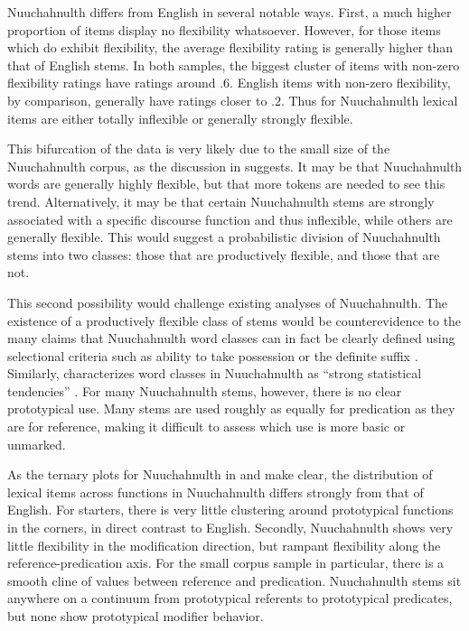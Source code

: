 Nuuchahnulth differs from English in several notable ways. First, a much higher proportion of items display no flexibility whatsoever. However, for those items which do exhibit flexibility, the average flexibility rating is generally higher than that of English stems. In both samples, the biggest cluster of items with non-zero flexibility ratings have ratings around $.6$. English items with non-zero flexibility, by comparison, generally have ratings closer to $.2$. Thus for Nuuchahnulth lexical items are either totally inflexible or generally strongly flexible.

This bifurcation of the data is very likely due to the small size of the Nuuchahnulth corpus, as the discussion in  suggests. It may be that Nuuchahnulth words are generally highly flexible, but that more tokens are needed to see this trend. Alternatively, it may be that certain Nuuchahnulth stems are strongly associated with a specific discourse function and thus inflexible, while others are generally flexible. This would suggest a probabilistic division of Nuuchahnulth stems into two classes: those that are productively flexible, and those that are not.

This second possibility would challenge existing analyses of Nuuchahnulth. The existence of a productively flexible class of stems would be counterevidence to the many claims that Nuuchahnulth word classes can in fact be clearly defined using selectional criteria such as ability to take possession or the definite suffix . Similarly, \textcite[???]{Nakayama2001} characterizes word classes in Nuuchahnulth as \enquote{strong statistical tendencies} . For many Nuuchahnulth stems, however, there is no clear prototypical use. Many stems are used roughly as equally for predication as they are for reference, making it difficult to assess which use is more basic or unmarked.

As the ternary plots for Nuuchahnulth in  and  make clear, the distribution of lexical items across functions in Nuuchahnulth differs strongly from that of English. For starters, there is very little clustering around prototypical functions in the corners, in direct contrast to English. Secondly, Nuuchahnulth shows very little flexibility in the modification direction, but rampant flexibility along the reference-predication axis. For the small corpus sample in particular, there is a smooth cline of values between reference and predication. Nuuchahnulth stems sit anywhere on a continuum from prototypical referents to prototypical predicates, but none show prototypical modifier behavior.

